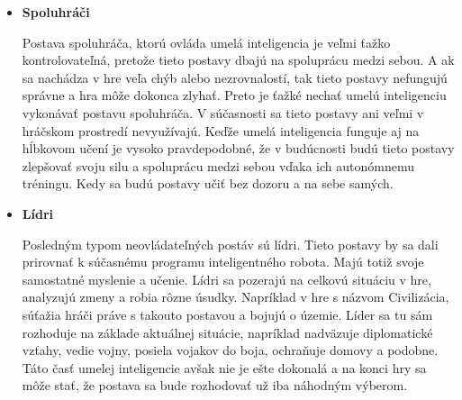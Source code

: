 \documentclass[10pt,twoside,slovak,a4paper]{article}
\begin{document}
\begin{itemize}
\item \textbf{Spoluhráči}

\quad Postava spoluhráča, ktorú ovláda umelá inteligencia je veľmi ťažko kontrolovateľná, pretože tieto postavy dbajú na spoluprácu medzi sebou. A ak sa nachádza v hre veľa chýb alebo nezrovnalostí, tak tieto postavy nefungujú správne a hra môže dokonca zlyhať. Preto je ťažké nechať umelú inteligenciu vykonávať postavu spoluhráča. V súčasnosti sa tieto postavy ani veľmi v hráčskom prostredí nevyužívajú. Keďže umelá inteligencia funguje aj na hĺbkovom učení je vysoko pravdepodobné, že v budúcnosti budú tieto postavy zlepšovať svoju silu a spoluprácu medzi sebou vďaka ich autonómnemu tréningu. Kedy sa budú postavy učiť bez dozoru a na sebe samých.  \cite{Types}

\item \textbf{Lídri}

\quad Posledným typom neovládateľných postáv sú lídri. Tieto postavy by sa dali prirovnať k súčasnému programu inteligentného robota. Majú totiž svoje samostatné myslenie a učenie. Lídri sa pozerajú na celkovú situáciu v hre, analyzujú zmeny a robia rôzne úsudky. Napríklad v hre s názvom Civilizácia, súťažia hráči práve s takouto postavou a bojujú o územie. Líder sa tu sám rozhoduje na základe aktuálnej situácie, napríklad nadväzuje diplomatické vzťahy, vedie vojny, posiela vojakov do boja, ochraňuje domovy a podobne. Táto časť umelej inteligencie avšak nie je ešte dokonalá a na konci hry sa môže stať, že postava sa bude rozhodovať už iba náhodným výberom.  \cite{Types}

\end{itemize}
\end{document}
